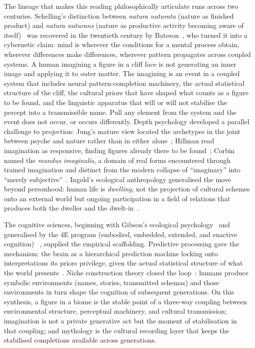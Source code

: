 \documentclass[11pt,a4paper]{article}
\begin{document}
The lineage that makes this reading philosophically articulate
runs across two centuries. Schelling's distinction between
\emph{natura naturata} (nature as finished product) and
\emph{natura naturans} (nature as productive activity becoming
aware of itself)~\citep{schelling1797ideas,schelling1799outline}
was recovered in the twentieth century by
Bateson~\citep{bateson1972steps,bateson1979mind}, who turned it
into a cybernetic claim: mind is wherever the conditions for a
mental process obtain, wherever differences make differences,
wherever pattern propagates across coupled systems. A human
imagining a figure in a cliff face is not generating an inner
image and applying it to outer matter. The imagining is an event
in a coupled system that includes neural pattern-completion
machinery, the actual statistical structure of the cliff, the
cultural priors that have shaped what counts as a figure to be
found, and the linguistic apparatus that will or will not
stabilise the percept into a transmissible name. Pull any element
from the system and the event does not occur, or occurs
differently. Depth psychology developed a parallel challenge to
projection: Jung's mature view located the archetypes in the joint
between psyche and nature rather than in either
alone~\citep{jung1959archetypes}; Hillman read imagination as
responsive, finding figures already there to be
found~\citep{hillman1975revisioning,hillman1981thought}; Corbin
named the \emph{mundus imaginalis}, a domain of real forms
encountered through trained imagination and distinct from the
modern collapse of ``imaginary'' into ``merely
subjective''~\citep{corbin1972mundus,abram1996spell}. Ingold's
ecological anthropology generalised the move beyond personhood:
human life is \emph{dwelling}, not the projection of cultural
schemes onto an external world but ongoing participation in a
field of relations that produces both the dweller and the
dwelt-in~\citep{ingold2000perception,descola2013beyond}.

The cognitive sciences, beginning with Gibson's ecological
psychology~\citep{gibson1979ecological} and generalised by the 4E
program (embodied, embedded, extended, and enactive cognition)
~\citep{varela1991embodied,clark1998extended,noe2004action},
supplied the empirical scaffolding. Predictive processing gave
the mechanism: the brain as a hierarchical prediction machine
locking onto interpretations its priors privilege, given the
actual statistical structure of what the world
presents~\citep{friston2010free,clark2016surfing,hohwy2013predictive}.
Niche construction theory closed the
loop~\citep{odlingsmee2003niche}: humans produce symbolic
environments (names, stories, transmitted schemas) and those
environments in turn shape the cognition of subsequent
generations. On this synthesis, a figure in a biome is the stable
point of a three-way coupling between environmental structure,
perceptual machinery, and cultural transmission; imagination is
not a private generative act but the moment of stabilisation in
that coupling; and mythology is the cultural recording layer that
keeps the stabilised completions available across generations.
\end{document}
